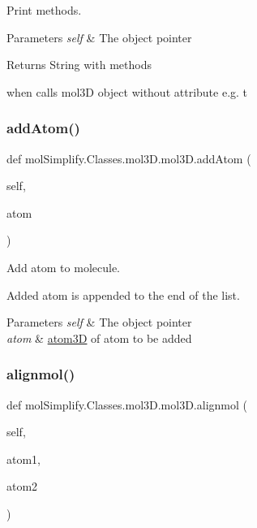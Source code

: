 Print methods. 


\begin{DoxyParams}{Parameters}
{\em self} & The object pointer \\
\hline
\end{DoxyParams}
\begin{DoxyReturn}{Returns}
String with methods \begin{DoxyVerb}when calls mol3D object without attribute e.g. t \end{DoxyVerb}
 
\end{DoxyReturn}
\mbox{\label{classmolSimplify_1_1Classes_1_1mol3D_1_1mol3D_a444e22d04c8ec79f1b2ce77ee9e1e8fc}} 
\subsubsection{\texorpdfstring{add\+Atom()}{addAtom()}}
{\footnotesize\ttfamily def mol\+Simplify.\+Classes.\+mol3\+D.\+mol3\+D.\+add\+Atom (\begin{DoxyParamCaption}\item[{}]{self,  }\item[{}]{atom }\end{DoxyParamCaption})}



Add atom to molecule. 

Added atom is appended to the end of the list. 
\begin{DoxyParams}{Parameters}
{\em self} & The object pointer \\
\hline
{\em atom} & \hyperlink{namespacemolSimplify_1_1Classes_1_1atom3D}{atom3D} of atom to be added \\
\hline
\end{DoxyParams}
\mbox{\label{classmolSimplify_1_1Classes_1_1mol3D_1_1mol3D_ab1d82358efa2110c56e1caf3ba9433e5}} 
\subsubsection{\texorpdfstring{alignmol()}{alignmol()}}
{\footnotesize\ttfamily def mol\+Simplify.\+Classes.\+mol3\+D.\+mol3\+D.\+alignmol (\begin{DoxyParamCaption}\item[{}]{self,  }\item[{}]{atom1,  }\item[{}]{atom2 }\end{DoxyParamCaption})}



